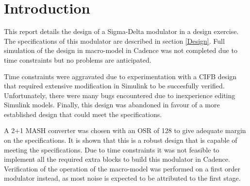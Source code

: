 \section{Introduction}
This report details the design of a Sigma-Delta modulator in a design exercise.
The specifications of this modulator are described in section \ref{Design}.
Full simulation of the design in macro-model in Cadence was not completed due to time constraints but no problems are anticipated.

%
Time constraints were aggravated due to experimentation with a CIFB design that required extensive modification in Simulink to be succesfully verified.
Unfortunately, there were many bugs encountered due to inexperience editing Simulink models.
Finally, this design was abandoned in favour of a more established design that could meet the specifications.

A 2+1 MASH converter was chosen with an OSR of 128 to give adequate margin on the specifications.
It is shown that this is a robust design that is capable of meeting the specifications.
Due to time constraints it was not feasible to implement all the required extra blocks to build this modulator in Cadence.
Verification of the operation of the macro-model was performed on a first order modulator instead, as most noise is expected to be attributed to the first stage.

